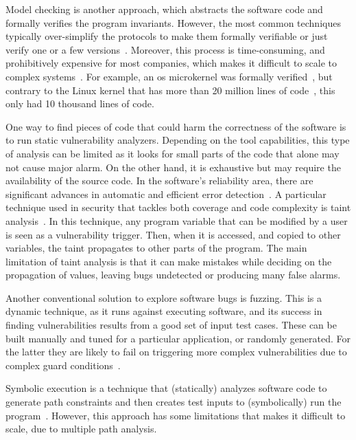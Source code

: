 Model checking is another approach, which abstracts the software code and formally verifies the program invariants.
However, the most common techniques typically over-simplify the protocols to make them formally verifiable or just verify one or a few versions~\cite{Klein:2009,Chen:2015,Nelson:2017}. 
Moreover, this process is time-consuming, and prohibitively expensive for most companies, which makes it difficult to scale to complex systems~\cite{Giuffrida:2013}.
For example, an \gls{os} microkernel was formally verified~\cite{Klein:2009}, but contrary to the Linux kernel that has more than 20 million lines of code~\cite{linux_kernel}, this only had 10 thousand lines of code.


One way to find pieces of code that could harm the correctness of the software is to run static vulnerability analyzers. 
Depending on the tool capabilities, this type of analysis can be limited as it looks for small parts of the code that alone may not cause major alarm.
On the other hand, it is exhaustive but may require the availability of the source code.
In the software's reliability area, there are significant advances in automatic and efficient error detection~\cite{Xu:2016}.
A particular technique used in security that tackles both coverage and code complexity is taint analysis~\cite{Newsome:2005,Yamaguchi:2015,Ming:2015}.
In this technique, any program variable that can be modified by a user is seen as a vulnerability trigger. 
Then, when it is accessed, and copied to other variables, the taint propagates to other parts of the program.
The main limitation of taint analysis is that it can make mistakes while deciding on the propagation of values, leaving bugs undetected or producing many false alarms.


Another conventional solution to explore software bugs is fuzzing.
This is a dynamic technique, as it runs against executing software, and its success in finding vulnerabilities results from a good set of input test cases.
These can be built manually and tuned for a particular application, or randomly generated.
For the latter they are likely to fail on triggering more complex vulnerabilities due to complex guard conditions~\cite{Gan:2018}.


Symbolic execution is a technique that (statically) analyzes software code to generate path constraints and then creates test inputs to (symbolically) run the program~\cite{Cadar:2008}.
However, this approach has some limitations that makes it difficult to scale, due to multiple path analysis.


